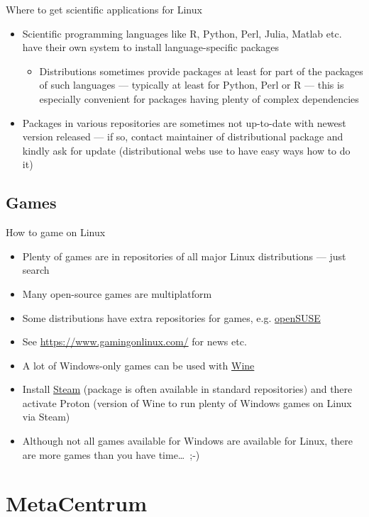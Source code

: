 \documentclass[compress, xelatex, 11pt, xcolor=svgnames, aspectratio=169,
	hyperref={
		bookmarks=true,
		unicode=true,
		colorlinks=true,
		pdftitle={Linux, command line and MetaCentrum},
		plainpages=false,
		pdfauthor={Vojtech Zeisek},
		pdfsubject={Course about use of Linux command line, writing shell scripts and using MetaCentrum of CESNET},
		pdfcreator={XeLaTeX},
		pdfkeywords={Linux, GNU, BASH, shell, command line, MetaCentrum},
		linkcolor=DarkRed, %
		anchorcolor=DarkBlue, %
		citecolor=Indigo, %
		filecolor=NavyBlue, %
		menucolor=DarkMagenta, %
		urlcolor=DarkBlue, %
		},
	url={hyphens, lowtilde} %
	]{beamer}
\begin{document}
\begin{frame}[allowframebreaks]{Where to get scientific applications for Linux}
\begin{itemize}
\begin{itemize}
		\end{itemize}
		\item Scientific programming languages like R, Python, Perl, Julia, Matlab etc. have their own system to install language-specific packages
		\begin{itemize}
			\item Distributions sometimes provide packages at least for part of the packages of such languages --- typically at least for Python, Perl or R --- this is especially convenient for packages having plenty of complex dependencies
		\end{itemize}
		\item Packages in various repositories are sometimes not up-to-date with newest version released --- if so, contact maintainer of distributional package and kindly ask for update (distributional webs use to have easy ways how to do it)
	\end{itemize}
\end{frame}

\subsection{Games}

\begin{frame}{How to game on Linux}
	\begin{itemize}
		\item Plenty of games are in repositories of all major Linux distributions --- just search
		\item Many open-source games are multiplatform
		\item Some distributions have extra repositories for games, e.g. \href{https://software.opensuse.org/packages/Games}{openSUSE}
		\item See \url{https://www.gamingonlinux.com/} for news etc.
		\item A lot of Windows-only games can be used with \href{https://appdb.winehq.org/}{Wine}
		\item Install \href{https://store.steampowered.com/}{Steam} (package is often available in standard repositories) and there activate Proton (version of Wine to run plenty of Windows games on Linux via Steam)
		\item Although not all games available for Windows are available for Linux, there are more games than you have time\ldots~;-)
	\end{itemize}
\end{frame}

\section{MetaCentrum} %
\end{document}
